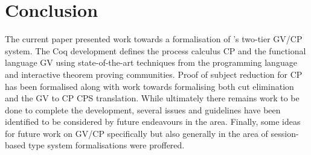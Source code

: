 \section{Conclusion}

The current paper presented work towards a formalisation of
\citeauthor{Wadler:2014}'s two-tier GV/CP system. The Coq development defines
the process calculus CP and the functional language GV using state-of-the-art
techniques from the programming language and interactive theorem proving
communities. Proof of subject reduction for CP has been formalised along with
work towards formalising both cut elimination and the GV to CP CPS
translation. While ultimately there remains work to be done to complete the
development, several issues and guidelines have been identified to be
considered by future endeavours in the area. Finally, some ideas for future
work on GV/CP specifically but also generally in the area of session-based
type system formalisations were proffered.
